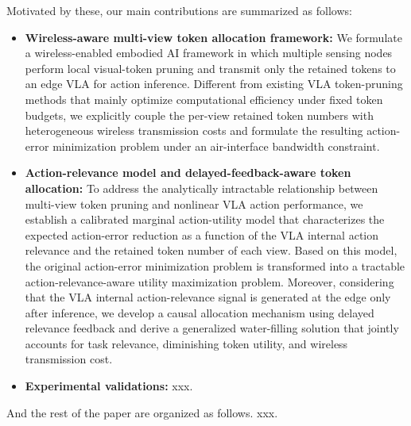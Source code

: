 \documentclass[lettersize,journal]{IEEEtran}
\theoremstyle{custom}
\begin{document}
\IEEEpubidadjcol
Motivated by these, our main contributions are summarized as follows: 
\begin{itemize}
    \item \textbf{Wireless-aware multi-view token allocation framework:}
    We formulate a wireless-enabled embodied AI framework in which multiple sensing nodes perform local visual-token pruning and transmit only the retained tokens to an edge VLA for action inference. 
    Different from existing VLA token-pruning methods that mainly optimize computational efficiency under fixed token budgets, we explicitly couple the per-view retained token numbers with heterogeneous wireless transmission costs and formulate the resulting action-error minimization problem under an air-interface bandwidth constraint.

    \item \textbf{Action-relevance model and delayed-feedback-aware token allocation:}
    To address the analytically intractable relationship between multi-view token pruning and nonlinear VLA action performance, we establish a calibrated marginal action-utility model that characterizes the expected action-error reduction as a function of the VLA internal action relevance and the retained token number of each view.
    Based on this model, the original action-error minimization problem is transformed into a tractable action-relevance-aware utility maximization problem.
    Moreover, considering that the VLA internal action-relevance signal is generated at the edge only after inference, we develop a causal allocation mechanism using delayed relevance feedback and derive a generalized water-filling solution that jointly accounts for task relevance, diminishing token utility, and wireless transmission cost.

    \item \textbf{Experimental validations:} xxx. 
\end{itemize}

And the rest of the paper are organized as follows. xxx. 
\end{document}
